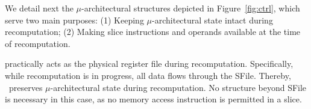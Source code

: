 We detail next the $\mu$-architectural structures depicted in Figure~\ref{fig:ctrl}, which serve two main purposes:
(1) Keeping $\mu$-architectural state intact during recomputation; 
(2) Making slice instructions and operands available at the time of recomputation.


  practically acts as the physical register file during recomputation. 
Specifically, while recomputation is in progress, all data flows through the SFile. Thereby, \arch\ preserves $\mu$-architectural state during recomputation. No structure beyond SFile is necessary in this case, as no memory access instruction is permitted in a slice.

